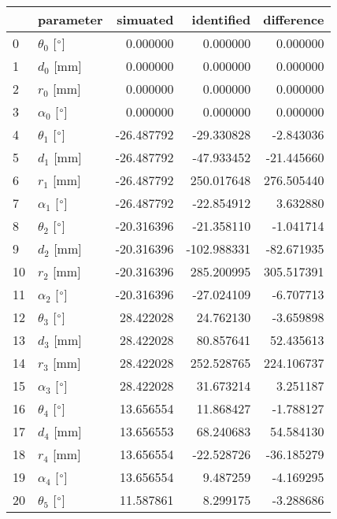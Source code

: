 \documentclass{standalone}%
\begin{document}
%
\normalsize%
\begin{tabular}{llrrr}
\toprule
{} &                 parameter &   simuated &  identified &  difference \\
\midrule
0  &  $\theta_{0}$ [$\degree$] &   0.000000 &    0.000000 &    0.000000 \\
1  &              $d_{0}$ [mm] &   0.000000 &    0.000000 &    0.000000 \\
2  &              $r_{0}$ [mm] &   0.000000 &    0.000000 &    0.000000 \\
3  &  $\alpha_{0}$ [$\degree$] &   0.000000 &    0.000000 &    0.000000 \\
4  &  $\theta_{1}$ [$\degree$] & -26.487792 &  -29.330828 &   -2.843036 \\
5  &              $d_{1}$ [mm] & -26.487792 &  -47.933452 &  -21.445660 \\
6  &              $r_{1}$ [mm] & -26.487792 &  250.017648 &  276.505440 \\
7  &  $\alpha_{1}$ [$\degree$] & -26.487792 &  -22.854912 &    3.632880 \\
8  &  $\theta_{2}$ [$\degree$] & -20.316396 &  -21.358110 &   -1.041714 \\
9  &              $d_{2}$ [mm] & -20.316396 & -102.988331 &  -82.671935 \\
10 &              $r_{2}$ [mm] & -20.316396 &  285.200995 &  305.517391 \\
11 &  $\alpha_{2}$ [$\degree$] & -20.316396 &  -27.024109 &   -6.707713 \\
12 &  $\theta_{3}$ [$\degree$] &  28.422028 &   24.762130 &   -3.659898 \\
13 &              $d_{3}$ [mm] &  28.422028 &   80.857641 &   52.435613 \\
14 &              $r_{3}$ [mm] &  28.422028 &  252.528765 &  224.106737 \\
15 &  $\alpha_{3}$ [$\degree$] &  28.422028 &   31.673214 &    3.251187 \\
16 &  $\theta_{4}$ [$\degree$] &  13.656554 &   11.868427 &   -1.788127 \\
17 &              $d_{4}$ [mm] &  13.656553 &   68.240683 &   54.584130 \\
18 &              $r_{4}$ [mm] &  13.656554 &  -22.528726 &  -36.185279 \\
19 &  $\alpha_{4}$ [$\degree$] &  13.656554 &    9.487259 &   -4.169295 \\
20 &  $\theta_{5}$ [$\degree$] &  11.587861 &    8.299175 &   -3.288686 \\

\end{tabular}
\end{document}
